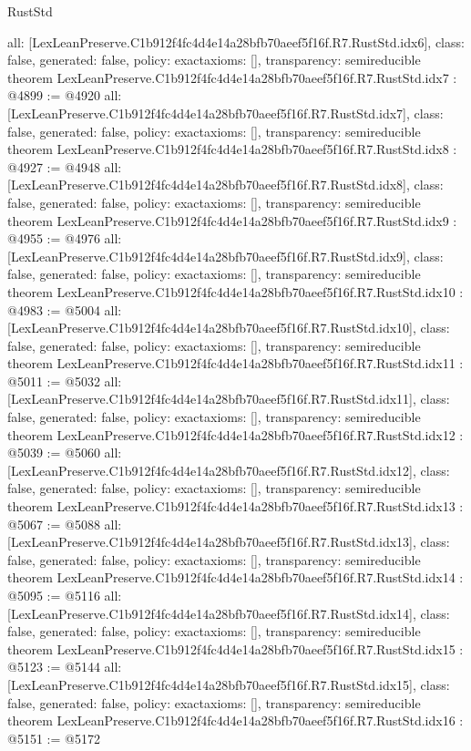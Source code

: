 \begin{lexlean}{RustStd}
\begin{coremodule}
{  all: [LexLeanPreserve.C1b912f4fc4d4e14a28bfb70aeef5f16f.R7.RustStd.idx6],
  class: false,
  generated: false,
  policy: exact{axioms: []},
  transparency: semireducible
}
theorem LexLeanPreserve.C1b912f4fc4d4e14a28bfb70aeef5f16f.R7.RustStd.idx7 : @4899 := @4920 {
  all: [LexLeanPreserve.C1b912f4fc4d4e14a28bfb70aeef5f16f.R7.RustStd.idx7],
  class: false,
  generated: false,
  policy: exact{axioms: []},
  transparency: semireducible
}
theorem LexLeanPreserve.C1b912f4fc4d4e14a28bfb70aeef5f16f.R7.RustStd.idx8 : @4927 := @4948 {
  all: [LexLeanPreserve.C1b912f4fc4d4e14a28bfb70aeef5f16f.R7.RustStd.idx8],
  class: false,
  generated: false,
  policy: exact{axioms: []},
  transparency: semireducible
}
theorem LexLeanPreserve.C1b912f4fc4d4e14a28bfb70aeef5f16f.R7.RustStd.idx9 : @4955 := @4976 {
  all: [LexLeanPreserve.C1b912f4fc4d4e14a28bfb70aeef5f16f.R7.RustStd.idx9],
  class: false,
  generated: false,
  policy: exact{axioms: []},
  transparency: semireducible
}
theorem LexLeanPreserve.C1b912f4fc4d4e14a28bfb70aeef5f16f.R7.RustStd.idx10 : @4983 := @5004 {
  all: [LexLeanPreserve.C1b912f4fc4d4e14a28bfb70aeef5f16f.R7.RustStd.idx10],
  class: false,
  generated: false,
  policy: exact{axioms: []},
  transparency: semireducible
}
theorem LexLeanPreserve.C1b912f4fc4d4e14a28bfb70aeef5f16f.R7.RustStd.idx11 : @5011 := @5032 {
  all: [LexLeanPreserve.C1b912f4fc4d4e14a28bfb70aeef5f16f.R7.RustStd.idx11],
  class: false,
  generated: false,
  policy: exact{axioms: []},
  transparency: semireducible
}
theorem LexLeanPreserve.C1b912f4fc4d4e14a28bfb70aeef5f16f.R7.RustStd.idx12 : @5039 := @5060 {
  all: [LexLeanPreserve.C1b912f4fc4d4e14a28bfb70aeef5f16f.R7.RustStd.idx12],
  class: false,
  generated: false,
  policy: exact{axioms: []},
  transparency: semireducible
}
theorem LexLeanPreserve.C1b912f4fc4d4e14a28bfb70aeef5f16f.R7.RustStd.idx13 : @5067 := @5088 {
  all: [LexLeanPreserve.C1b912f4fc4d4e14a28bfb70aeef5f16f.R7.RustStd.idx13],
  class: false,
  generated: false,
  policy: exact{axioms: []},
  transparency: semireducible
}
theorem LexLeanPreserve.C1b912f4fc4d4e14a28bfb70aeef5f16f.R7.RustStd.idx14 : @5095 := @5116 {
  all: [LexLeanPreserve.C1b912f4fc4d4e14a28bfb70aeef5f16f.R7.RustStd.idx14],
  class: false,
  generated: false,
  policy: exact{axioms: []},
  transparency: semireducible
}
theorem LexLeanPreserve.C1b912f4fc4d4e14a28bfb70aeef5f16f.R7.RustStd.idx15 : @5123 := @5144 {
  all: [LexLeanPreserve.C1b912f4fc4d4e14a28bfb70aeef5f16f.R7.RustStd.idx15],
  class: false,
  generated: false,
  policy: exact{axioms: []},
  transparency: semireducible
}
theorem LexLeanPreserve.C1b912f4fc4d4e14a28bfb70aeef5f16f.R7.RustStd.idx16 : @5151 := @5172 {
}
\end{coremodule}
\end{lexlean}
